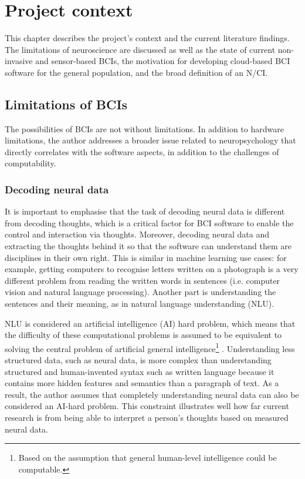 \chapter{Project context}
\graphicspath{{Chapter2/Figs/}{Chapter2/Figs/}}

This chapter describes the project’s context and the current literature findings. The limitations of neuroscience are discussed as well as the state of current non-invasive and sensor-based BCIs, the motivation for developing cloud-based BCI software for the general population, and the broad definition of an N/CI.

\section{Limitations of BCIs}
\label{chapter2-limitations-of-bcis}

The possibilities of BCIs are not without limitations. In addition to hardware limitations, the author addresses a broader issue related to neuropsychology that directly correlates with the software aspects, in addition to the challenges of computability.

\subsection{Decoding neural data}
\label{chapter2-decoding-neural-data}

It is important to emphasise that the task of decoding neural data is different from decoding thoughts, which is a critical factor for BCI software to enable the control and interaction via thoughts. Moreover, decoding neural data and extracting the thoughts behind it so that the software can understand them are disciplines in their own right. This is similar in machine learning use cases: for example, getting computers to recognise letters written on a photograph is a very different problem from reading the written words in sentences (i.e. computer vision and natural language processing). Another part is understanding the sentences and their meaning, as in natural language understanding (NLU).

NLU is considered an artificial intelligence (AI) hard problem, which means that the difficulty of these computational problems is assumed to be equivalent to solving the central problem of artificial general intelligence\footnote{Based on the assumption that general human-level intelligence could be computable.} \citep{demasi_theoretical_2010}. Understanding less structured data, such as neural data, is more complex than understanding structured and human-invented syntax such as written language because it contains more hidden features and semantics than a paragraph of text. As a result, the author assumes that completely understanding neural data can also be considered an AI-hard problem. This constraint illustrates well how far current research is from being able to interpret a person’s thoughts based on measured neural data.

